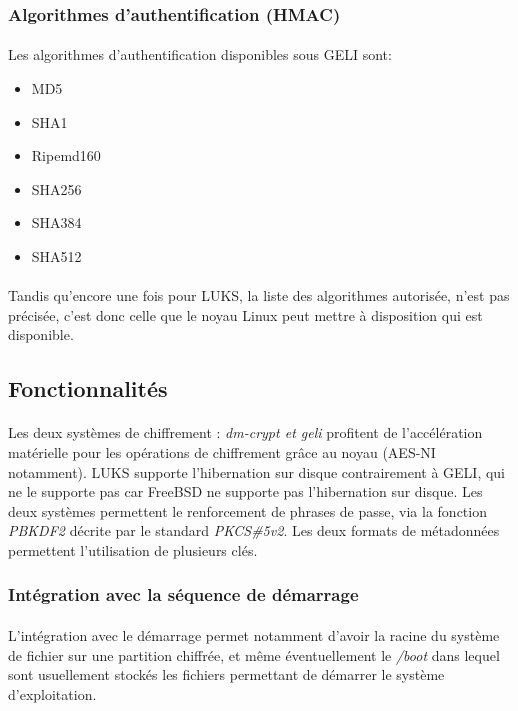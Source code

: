 \subsubsection{Algorithmes d'authentification (HMAC)}
\paragraph{}
Les algorithmes d'authentification disponibles sous GELI sont:
\begin{itemize}
	\item MD5
	\item SHA1
	\item Ripemd160
	\item SHA256
	\item SHA384
	\item SHA512
\end{itemize}

\paragraph{}
Tandis qu'encore une fois pour LUKS, la liste des algorithmes autorisée, n'est 
pas précisée, c'est donc celle que le noyau Linux peut mettre à disposition 
qui est disponible.

\subsection{Fonctionnalités}
\paragraph{}
Les deux systèmes de chiffrement : {\em dm-crypt \em et \em geli} profitent 
de l'accélération matérielle pour les opérations de chiffrement grâce au 
noyau (AES-NI notamment). LUKS supporte l'hibernation sur disque 
contrairement à GELI, qui ne le supporte pas car FreeBSD ne supporte pas 
l'hibernation sur disque. Les deux systèmes permettent le renforcement de 
phrases de passe, via la fonction {\em PBKDF2} décrite par le standard 
{\em PKCS\#5v2}. Les deux formats de métadonnées permettent l'utilisation de 
plusieurs clés.

\subsubsection{Intégration avec la séquence de démarrage}
\paragraph{}
L'intégration avec le démarrage permet notamment d'avoir la racine du système 
de fichier sur une partition chiffrée, et même éventuellement le {\em /boot}
dans lequel sont usuellement stockés les fichiers permettant de démarrer le 
système d'exploitation.

